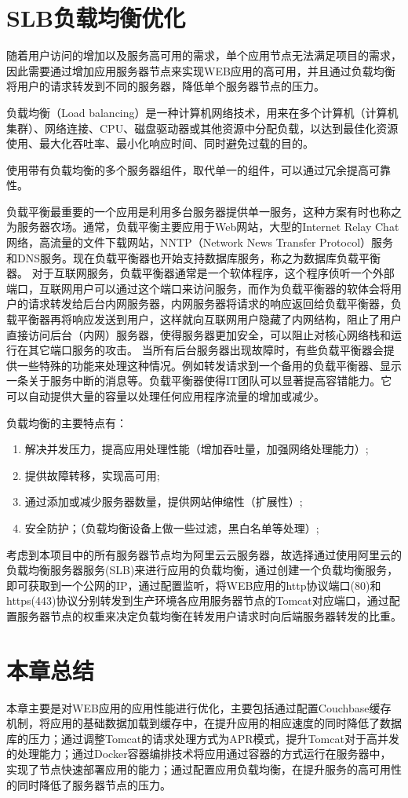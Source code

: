 \section{SLB负载均衡优化}

随着用户访问的增加以及服务高可用的需求，单个应用节点无法满足项目的需求，因此需要通过增加应用服务器节点来实现WEB应用的高可用，并且通过负载均衡将用户的请求转发到不同的服务器，降低单个服务器节点的压力。

负载均衡（Load balancing）是一种计算机网络技术，用来在多个计算机（计算机集群）、网络连接、CPU、磁盘驱动器或其他资源中分配负载，以达到最佳化资源使用、最大化吞吐率、最小化响应时间、同时避免过载的目的。

使用带有负载均衡的多个服务器组件，取代单一的组件，可以通过冗余提高可靠性。

负载平衡最重要的一个应用是利用多台服务器提供单一服务，这种方案有时也称之为服务器农场。通常，负载平衡主要应用于Web网站，大型的Internet Relay Chat网络，高流量的文件下载网站，NNTP（Network News Transfer Protocol）服务和DNS服务。现在负载平衡器也开始支持数据库服务，称之为数据库负载平衡器。
对于互联网服务，负载平衡器通常是一个软体程序，这个程序侦听一个外部端口，互联网用户可以通过这个端口来访问服务，而作为负载平衡器的软体会将用户的请求转发给后台内网服务器，内网服务器将请求的响应返回给负载平衡器，负载平衡器再将响应发送到用户，这样就向互联网用户隐藏了内网结构，阻止了用户直接访问后台（内网）服务器，使得服务器更加安全，可以阻止对核心网络栈和运行在其它端口服务的攻击。
当所有后台服务器出现故障时，有些负载平衡器会提供一些特殊的功能来处理这种情况。例如转发请求到一个备用的负载平衡器、显示一条关于服务中断的消息等。负载平衡器使得IT团队可以显著提高容错能力。它可以自动提供大量的容量以处理任何应用程序流量的增加或减少\cite{wei2010system}。

负载均衡的主要特点有：
\begin{enumerate}
\item 解决并发压力，提高应用处理性能（增加吞吐量，加强网络处理能力）;
\item 提供故障转移，实现高可用;
\item 通过添加或减少服务器数量，提供网站伸缩性（扩展性）;
\item 安全防护；（负载均衡设备上做一些过滤，黑白名单等处理）;
\end{enumerate}

考虑到本项目中的所有服务器节点均为阿里云云服务器，故选择通过使用阿里云的负载均衡服务器服务(SLB)来进行应用的负载均衡，通过创建一个负载均衡服务，即可获取到一个公网的IP，通过配置监听，将WEB应用的http协议端口(80)和https(443)协议分别转发到生产环境各应用服务器节点的Tomcat对应端口，通过配置服务器节点的权重来决定负载均衡在转发用户请求时向后端服务器转发的比重。

\section{本章总结}
本章主要是对WEB应用的应用性能进行优化，主要包括通过配置Couchbase缓存机制，将应用的基础数据加载到缓存中，在提升应用的相应速度的同时降低了数据库的压力；通过调整Tomcat的请求处理方式为APR模式，提升Tomcat对于高并发的处理能力；通过Docker容器编排技术将应用通过容器的方式运行在服务器中，实现了节点快速部署应用的能力；通过配置应用负载均衡，在提升服务的高可用性的同时降低了服务器节点的压力。
